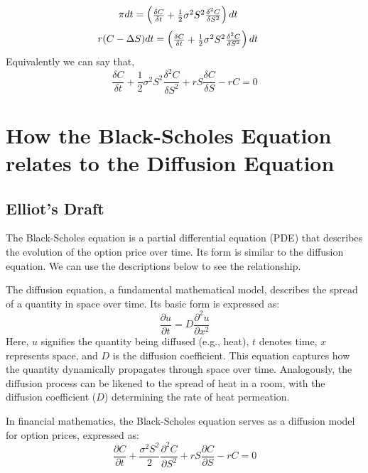 \documentclass[11pt]{article}
\begin{document}
\begin{equation*}
\pi dt = 
\setlength{\arraycolsep}{2pt}\begin{pmatrix}
\frac{\delta C}{\delta t} + \frac{1}{2}\sigma^2 S^2\frac{\delta^2 C}{\delta S^2}
\end{pmatrix}dt \phantom{ccc}
\end{equation*}
\begin{equation*}
r(C-\Delta S)dt = 
\setlength{\arraycolsep}{2pt}\begin{pmatrix}
\frac{\delta C}{\delta t} + \frac{1}{2}\sigma^2 S^2\frac{\delta^2 C}{\delta S^2}
\end{pmatrix}dt \phantom{ccc}
\end{equation*}
Equivalently we can say that,
\begin{equation*}
\frac{\delta C}{\delta t} + \frac{1}{2}\sigma^2 S^2 \frac{\delta ^2 C}{\delta S^2} + rS \frac{\delta C}{\delta S} - rC = 0
\end{equation*}

\section{How the Black-Scholes Equation relates to the Diffusion Equation}

\subsection{Elliot's Draft}

The Black-Scholes equation is a partial differential equation (PDE) that describes the evolution of the option price over time. Its form is similar to the diffusion equation. We can use the descriptions below to see the relationship.


The diffusion equation, a fundamental mathematical model, describes the spread of a quantity in space over time. Its basic form is expressed as:
\[ \frac{\partial u}{\partial t} = D \frac{\partial^2 u}{\partial x^2} \]
Here, \(u\) signifies the quantity being diffused (e.g., heat), \(t\) denotes time, \(x\) represents space, and \(D\) is the diffusion coefficient. This equation captures how the quantity dynamically propagates through space over time. Analogously, the diffusion process can be likened to the spread of heat in a room, with the diffusion coefficient (\(D\)) determining the rate of heat permeation.


In financial mathematics, the Black-Scholes equation serves as a diffusion model for option prices, expressed as:
\[ \frac{\partial C}{\partial t} + \frac{\sigma^2S^2}{2} \frac{\partial^2 C}{\partial S^2} + rS \frac{\partial C}{\partial S} - rC = 0 \]
\end{document}
